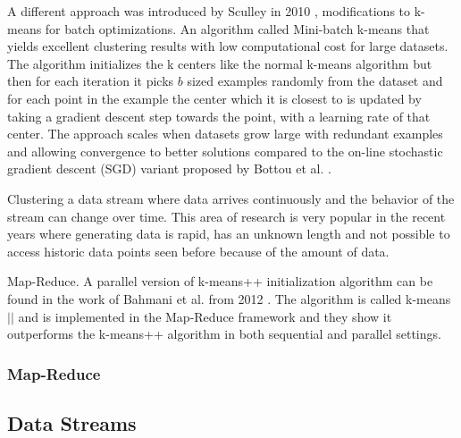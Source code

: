 A different approach was introduced by Sculley in 2010 \citep{Sculley:2010}, modifications to k-means for batch optimizations. An algorithm called Mini-batch k-means that yields excellent clustering results with low computational cost for large datasets. The algorithm initializes the k centers like the normal k-means algorithm but then for each iteration it picks $b$ sized examples randomly from the dataset and for each point in the example the center which it is closest to is updated by taking a gradient descent step towards the point, with a learning rate of that center. The approach scales when datasets grow large with redundant examples and allowing convergence to better solutions compared to the on-line stochastic gradient descent (SGD) variant proposed by Bottou et al. \citep{Bottou:1995}.

Clustering a data stream where data arrives continuously and the behavior of the stream can change over time. This area of research is very popular in the recent years where generating data is rapid, has an unknown length and not possible to access historic data points seen before because of the amount of data.

Map-Reduce.
A parallel version of k-means++ initialization algorithm can be found in the work of Bahmani et al. from 2012 \citep{Bahmani:2012}. The algorithm is called k-means$||$ and is implemented in the Map-Reduce framework and they show it outperforms the k-means++ algorithm in both sequential and parallel settings.




\subsubsection{Map-Reduce}

\subsection{Data Streams}

